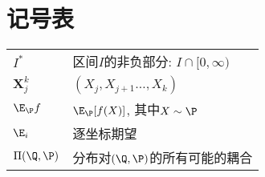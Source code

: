 \section*{记号表}

\begin{tabular}{p{} p{}}
\hline
	$I^*$ & 区间$I$的非负部分: $I \cap [0, \infty)$ \\
	$\bm X_j^k$ & $(X_j, X_{j+1} \dots, X_k)$ \\
	$\E_{\P} f$ & $\E_{\P} [f(X)]$, 其中$X \sim \P$ \\
	$\E_i$ & 逐坐标期望 \\
	$\Pi(\Q, \P)$ & 分布对$(\Q, \P)$的所有可能的耦合
\end{tabular}
